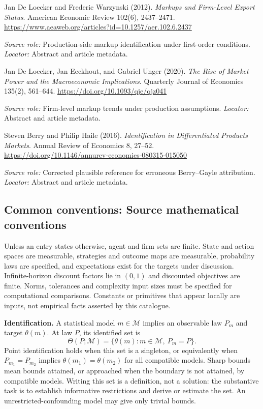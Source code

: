 \documentclass[11pt,a4paper]{article}
\begin{document}
\begin{enumerate}[label={[S\arabic*]},leftmargin=*]

\item Jan De Loecker and Frederic Warzynski (2012). \emph{Markups and Firm-Level Export Status}. American Economic Review 102(6), 2437--2471. \url{https://www.aeaweb.org/articles?id=10.1257/aer.102.6.2437}\par \textit{Source role:} Production-side markup identification under first-order conditions. \textit{Locator:} Abstract and article metadata.

\item Jan De Loecker, Jan Eeckhout, and Gabriel Unger (2020). \emph{The Rise of Market Power and the Macroeconomic Implications}. Quarterly Journal of Economics 135(2), 561--644. \url{https://doi.org/10.1093/qje/qjz041}\par \textit{Source role:} Firm-level markup trends under production assumptions. \textit{Locator:} Abstract and article metadata.

\item Steven Berry and Philip Haile (2016). \emph{Identification in Differentiated Products Markets}. Annual Review of Economics 8, 27--52. \url{https://doi.org/10.1146/annurev-economics-080315-015050}\par \textit{Source role:} Corrected plausible reference for erroneous Berry--Gayle attribution. \textit{Locator:} Abstract and article metadata.

\end{enumerate}

\subsection*{Common conventions: Source mathematical conventions}

Unless an entry states otherwise, agent and firm sets are finite. State and action spaces are measurable, strategies and outcome maps are measurable, probability laws are specified, and expectations exist for the targets under discussion. Infinite-horizon discount factors lie in $(0,1)$ and discounted objectives are finite. Norms, tolerances and complexity input sizes must be specified for computational comparisons. Constants or primitives that appear locally are inputs, not empirical facts asserted by this catalogue.

\textbf{Identification.} A statistical model $m\in\mathcal M$ implies an observable law $P_m$ and target $\theta(m)$. At law $P$, its identified set is
\[
\Theta(P;\mathcal M)=\{\theta(m):m\in\mathcal M,\ P_m=P\}.
\]
Point identification holds when this set is a singleton, or equivalently when $P_{m_1}=P_{m_2}$ implies $\theta(m_1)=\theta(m_2)$ for all compatible models. Sharp bounds mean bounds attained, or approached when the boundary is not attained, by compatible models. Writing this set is a definition, not a solution: the substantive task is to establish informative restrictions and derive or estimate the set. An unrestricted-confounding model may give only trivial bounds.
\end{document}
